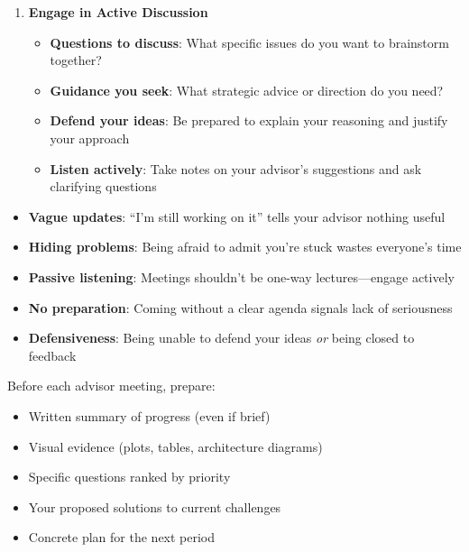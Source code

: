 \documentclass[11pt,a4paper]{article}
\begin{document}
\begin{enumerate}[leftmargin=1.5em]
    \item \textbf{Engage in Active Discussion}
    \begin{itemize}
        \item \textbf{Questions to discuss}: What specific issues do you want to brainstorm together?
        \item \textbf{Guidance you seek}: What strategic advice or direction do you need?
        \item \textbf{Defend your ideas}: Be prepared to explain your reasoning and justify your approach
        \item \textbf{Listen actively}: Take notes on your advisor's suggestions and ask clarifying questions
    \end{itemize}
\end{enumerate}

\begin{tcolorbox}[colback=yellow!5,colframe=orange!60,title={Common Pitfalls to Avoid}]
\begin{itemize}
    \item \textbf{Vague updates}: ``I'm still working on it'' tells your advisor nothing useful
    \item \textbf{Hiding problems}: Being afraid to admit you're stuck wastes everyone's time
    \item \textbf{Passive listening}: Meetings shouldn't be one-way lectures—engage actively
    \item \textbf{No preparation}: Coming without a clear agenda signals lack of seriousness
    \item \textbf{Defensiveness}: Being unable to defend your ideas \textit{or} being closed to feedback
\end{itemize}
\end{tcolorbox}

\begin{tcolorbox}[colback=blue!5,colframe=blue!40,title={Meeting Preparation Checklist}]
Before each advisor meeting, prepare:
\begin{itemize}
    \item Written summary of progress (even if brief)
    \item Visual evidence (plots, tables, architecture diagrams)
    \item Specific questions ranked by priority
    \item Your proposed solutions to current challenges
    \item Concrete plan for the next period
\end{itemize}
\end{tcolorbox}
\end{document}
